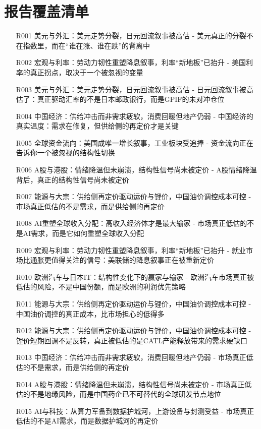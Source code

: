 \documentclass[11pt]{ctexart}
\begin{document}
\section{报告覆盖清单}
\begin{itemize}
  \item [R001] 美元与外汇：美元走势分裂，日元回流叙事被高估 - 美元真正的分裂不在指数里，而在“谁在涨、谁在跌”的背离中
  \item [R002] 宏观与利率：劳动力韧性重塑降息叙事，利率“新地板”已抬升 - 美国利率的真正拐点，取决于一个被忽视的变量
  \item [R003] 美元与外汇：美元走势分裂，日元回流叙事被高估 - 日元回流叙事被高估了：真正驱动汇率的不是日本邮政银行，而是GPIF的未对冲仓位
  \item [R004] 中国经济：供给冲击而非需求疲软，消费回暖但地产仍弱 - 中国经济的真实温度：需求在修复，但供给侧的再定价才是关键
  \item [R005] 全球资金流向：美国成唯一增长叙事，工业板块受追捧 - 资金流向正在告诉你一个被忽视的结构性切换
  \item [R006] A股与港股：情绪降温但未崩溃，结构性信号尚未被定价 - A股情绪降温背后，真正的结构性信号尚未被定价
  \item [R007] 能源与大宗：供给侧再定价驱动运价与锂价，中国油价调控成本可控 - 市场真正低估的不是需求，而是供给侧的再定价
  \item [R008] AI重塑全球收入分配：高收入经济体才是最大输家 - 市场真正低估的不是AI需求，而是它如何重塑全球收入分配
  \item [R009] 宏观与利率：劳动力韧性重塑降息叙事，利率“新地板”已抬升 - 就业市场比通胀更值得关注的信号：美联储的降息叙事正在被重新定价
  \item [R010] 欧洲汽车与日本IT：结构性变化下的赢家与输家 - 欧洲汽车市场真正被低估的风险，不是中国份额，而是欧洲的利润优先策略
  \item [R011] 能源与大宗：供给侧再定价驱动运价与锂价，中国油价调控成本可控 - 中国油价调控的真正成本，比市场担心的低得多
  \item [R012] 能源与大宗：供给侧再定价驱动运价与锂价，中国油价调控成本可控 - 锂价短期回调不是反转，真正被低估的是CATL产能释放带来的需求硬缺口
  \item [R013] 中国经济：供给冲击而非需求疲软，消费回暖但地产仍弱 - 市场真正低估的不是需求，而是供给侧的再定价
  \item [R014] A股与港股：情绪降温但未崩溃，结构性信号尚未被定价 - 市场真正低估的不是地缘风险，而是中国药企已不可替代的全球研发节点地位
  \item [R015] AI与科技：从算力军备到数据护城河，上游设备与封测受益 - 市场真正低估的不是AI需求，而是数据护城河的再定价

\end{itemize}
\end{document}
